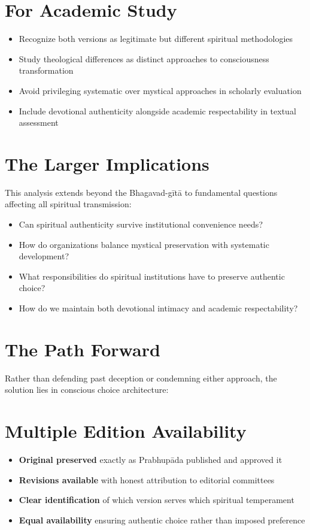 \documentclass[11pt,twoside]{book}
\begin{document}
\section*{For Academic Study}
\label{sec:org9c05219}
\begin{itemize}
\item Recognize both versions as legitimate but different spiritual methodologies
\item Study theological differences as distinct approaches to consciousness transformation
\item Avoid privileging systematic over mystical approaches in scholarly evaluation
\item Include devotional authenticity alongside academic respectability in textual assessment
\end{itemize}
\section*{The Larger Implications}
\label{sec:org89db205}

This analysis extends beyond the Bhagavad-gītā to fundamental questions affecting all spiritual transmission:

\begin{itemize}
\item Can spiritual authenticity survive institutional convenience needs?
\item How do organizations balance mystical preservation with systematic development?
\item What responsibilities do spiritual institutions have to preserve authentic choice?
\item How do we maintain both devotional intimacy and academic respectability?
\end{itemize}
\section*{The Path Forward}
\label{sec:org31ba2d1}

Rather than defending past deception or condemning either approach, the solution lies in conscious choice architecture:
\section*{Multiple Edition Availability}
\label{sec:org9e66a6c}
\begin{itemize}
\item \textbf{\textbf{Original preserved}} exactly as Prabhupāda published and approved it
\item \textbf{\textbf{Revisions available}} with honest attribution to editorial committees
\item \textbf{\textbf{Clear identification}} of which version serves which spiritual temperament
\item \textbf{\textbf{Equal availability}} ensuring authentic choice rather than imposed preference
\end{itemize}
\end{document}

